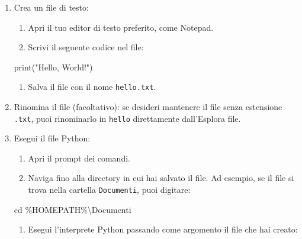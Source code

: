 \documentclass[
  letterpaper,
]{scrbook}
\newenvironment{Shaded}{\begin{snugshade}}{\end{snugshade}}
\newcommand{\BuiltInTok}[1]{\textcolor[rgb]{0.00,0.23,0.31}{#1}}
\newcommand{\DataTypeTok}[1]{\textcolor[rgb]{0.68,0.00,0.00}{#1}}
\newcommand{\NormalTok}[1]{\textcolor[rgb]{0.00,0.23,0.31}{#1}}
\newcommand{\StringTok}[1]{\textcolor[rgb]{0.13,0.47,0.30}{#1}}
\providecommand{\tightlist}{%
  \setlength{\itemsep}{0pt}\setlength{\parskip}{0pt}}\usepackage{longtable,booktabs,array}
\begin{document}
\begin{enumerate}
\def\labelenumi{\arabic{enumi}.}
\item
  Crea un file di testo:

  \begin{enumerate}
  \def\labelenumii{\arabic{enumii}.}
  \tightlist
  \item
    Apri il tuo editor di testo preferito, come Notepad.
  \item
    Scrivi il seguente codice nel file:
  \end{enumerate}

\begin{Shaded}
\begin{Highlighting}[]
 \BuiltInTok{print}\NormalTok{(}\StringTok{"Hello, World!"}\NormalTok{)}
\end{Highlighting}
\end{Shaded}

  \begin{enumerate}
  \def\labelenumii{\arabic{enumii}.}
  \setcounter{enumii}{2}
  \tightlist
  \item
    Salva il file con il nome \texttt{hello.txt}.
  \end{enumerate}
\item
  Rinomina il file (facoltativo): se desideri mantenere il file senza
  estensione \texttt{.txt}, puoi rinominarlo in \texttt{hello}
  direttamente dall'Esplora file.
\item
  Esegui il file Python:

  \begin{enumerate}
  \def\labelenumii{\arabic{enumii}.}
  \tightlist
  \item
    Apri il prompt dei comandi.
  \item
    Naviga fino alla directory in cui hai salvato il file. Ad esempio,
    se il file si trova nella cartella \texttt{Documenti}, puoi
    digitare:
  \end{enumerate}

\begin{Shaded}
\begin{Highlighting}[]
\BuiltInTok{cd}\NormalTok{ \%HOMEPATH\%}\DataTypeTok{\textbackslash{}D}\NormalTok{ocumenti}
\end{Highlighting}
\end{Shaded}

  \begin{enumerate}
  \def\labelenumii{\arabic{enumii}.}
  \setcounter{enumii}{2}
  \tightlist
  \item
    Esegui l'interprete Python passando come argomento il file che hai
    creato:
  \end{enumerate}


\end{enumerate}
\end{document}
